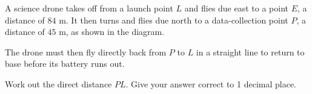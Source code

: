 \begin{question}
\noindent A science drone takes off from a launch point $L$ and flies due east to a point $E$, a distance of $84$ m. It then turns and flies due north to a data-collection point $P$, a distance of $45$ m, as shown in the diagram.

\begin{center}
\end{center}

\noindent The drone must then fly directly back from $P$ to $L$ in a straight line to return to base before its battery runs out.

Work out the direct distance $PL$.
Give your answer correct to 1 decimal place.

\vspace{4cm}
\end{question}
